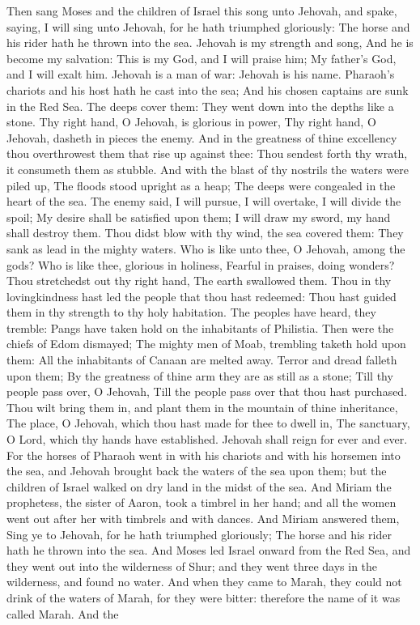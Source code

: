 Then sang Moses and the children of Israel this song unto Jehovah, and spake, saying, I will sing unto Jehovah, for he hath triumphed gloriously: The horse and his rider hath he thrown into the sea.  Jehovah is my strength and song, And he is become my salvation: This is my God, and I will praise him; My father’s God, and I will exalt him.  Jehovah is a man of war: Jehovah is his name.  Pharaoh’s chariots and his host hath he cast into the sea; And his chosen captains are sunk in the Red Sea.  The deeps cover them: They went down into the depths like a stone.  Thy right hand, O Jehovah, is glorious in power, Thy right hand, O Jehovah, dasheth in pieces the enemy.  And in the greatness of thine excellency thou overthrowest them that rise up against thee: Thou sendest forth thy wrath, it consumeth them as stubble.  And with the blast of thy nostrils the waters were piled up, The floods stood upright as a heap; The deeps were congealed in the heart of the sea.  The enemy said, I will pursue, I will overtake, I will divide the spoil; My desire shall be satisfied upon them; I will draw my sword, my hand shall destroy them.  Thou didst blow with thy wind, the sea covered them: They sank as lead in the mighty waters.  Who is like unto thee, O Jehovah, among the gods? Who is like thee, glorious in holiness, Fearful in praises, doing wonders?  Thou stretchedst out thy right hand, The earth swallowed them.  Thou in thy lovingkindness hast led the people that thou hast redeemed: Thou hast guided them in thy strength to thy holy habitation.  The peoples have heard, they tremble: Pangs have taken hold on the inhabitants of Philistia.  Then were the chiefs of Edom dismayed; The mighty men of Moab, trembling taketh hold upon them: All the inhabitants of Canaan are melted away.  Terror and dread falleth upon them; By the greatness of thine arm they are as still as a stone; Till thy people pass over, O Jehovah, Till the people pass over that thou hast purchased.  Thou wilt bring them in, and plant them in the mountain of thine inheritance, The place, O Jehovah, which thou hast made for thee to dwell in, The sanctuary, O Lord, which thy hands have established.  Jehovah shall reign for ever and ever.  For the horses of Pharaoh went in with his chariots and with his horsemen into the sea, and Jehovah brought back the waters of the sea upon them; but the children of Israel walked on dry land in the midst of the sea. And Miriam the prophetess, the sister of Aaron, took a timbrel in her hand; and all the women went out after her with timbrels and with dances. And Miriam answered them, Sing ye to Jehovah, for he hath triumphed gloriously; The horse and his rider hath he thrown into the sea.  And Moses led Israel onward from the Red Sea, and they went out into the wilderness of Shur; and they went three days in the wilderness, and found no water. And when they came to Marah, they could not drink of the waters of Marah, for they were bitter: therefore the name of it was called Marah. And the 